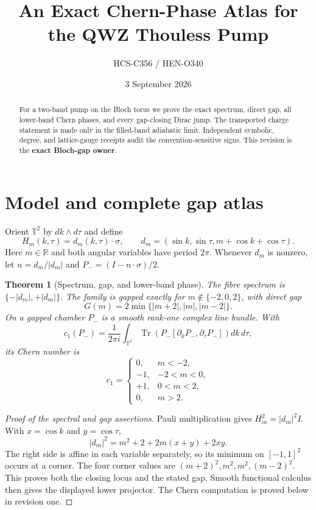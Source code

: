 \documentclass[10pt]{article}
\title{An Exact Chern-Phase Atlas for the QWZ Thouless Pump}
\author{HCS-C356 / HEN-O340}
\date{3 September 2026}
\newtheorem{theorem}{Theorem}
\newcommand{\Tr}{\operatorname{Tr}}
\newcommand{\T}{\mathbb T}
\begin{document}
\maketitle
\begin{abstract}
For a two-band pump on the Bloch torus we prove the exact spectrum, direct gap,
all lower-band Chern phases, and every gap-closing Dirac jump.  The transported
charge statement is made only in the filled-band adiabatic limit.  Independent
symbolic, degree, and lattice-gauge receipts audit the convention-sensitive
signs.  This revision is the \textbf{exact Bloch-gap owner}.
\end{abstract}

\section{Model and complete gap atlas}
Orient $\T^2$ by $dk\wedge d\tau$ and define
\begin{equation}\label{eq:model}
 H_m(k,\tau)=d_m(k,\tau)\cdot\sigma,\qquad
 d_m=(\sin k,\sin\tau,m+\cos k+\cos\tau).
\end{equation}
Here $m\in\mathbb R$ and both angular variables have period $2\pi$.  Whenever
$d_m$ is nonzero, let $n=d_m/|d_m|$ and $P_-=(I-n\cdot\sigma)/2$.

\begin{theorem}[Spectrum, gap, and lower-band phase]\label{thm:main}
The fibre spectrum is $\{-|d_m|,+|d_m|\}$.  The family is gapped exactly for
$m\notin\{-2,0,2\}$, with direct gap
\[
 G(m)=2\min\{|m+2|,|m|,|m-2|\}.
\]
On a gapped chamber $P_-$ is a smooth rank-one complex line bundle.  With
\begin{equation}\label{eq:c1}
 c_1(P_-)=\frac1{2\pi i}\int_{\T^2}
 \Tr\!\left(P_-[\partial_kP_-,\partial_\tau P_-]\right)dk\,d\tau,
\end{equation}
its Chern number is
\[
c_1=\begin{cases}
0,&m<-2,\\ -1,&-2<m<0,\\ +1,&0<m<2,\\ 0,&m>2.
\end{cases}
\]
\end{theorem}

\begin{proof}[Proof of the spectral and gap assertions]
Pauli multiplication gives $H_m^2=|d_m|^2I$.  With $x=\cos k$ and
$y=\cos\tau$,
\begin{equation}\label{eq:norm}
 |d_m|^2=m^2+2+2m(x+y)+2xy.
\end{equation}
The right side is affine in each variable separately, so its minimum on
$[-1,1]^2$ occurs at a corner.  The four corner values are
$(m+2)^2,m^2,m^2,(m-2)^2$.  This proves both the closing locus and the stated
gap.  Smooth functional calculus then gives the displayed lower projector.
The Chern computation is proved below in revision one.
\end{proof}
\end{document}
